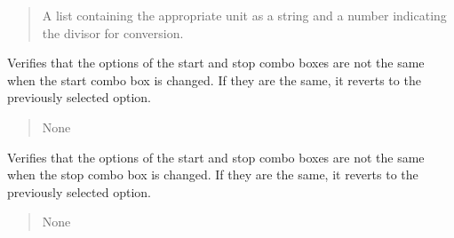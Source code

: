 \documentclass[letterpaper,10pt,english]{sphinxmanual}
\begin{document}
\begin{fulllineitems}
\begin{fulllineitems}
\begin{quote}
\begin{description}
\sphinxAtStartPar
A list containing the appropriate unit as a string and a number indicating 
the divisor for conversion.

\end{description}\end{quote}

\end{fulllineitems}


\begin{fulllineitems}
\label{\detokenize{FLIMGraphics:FLIMGraphics.FLIMGraphic.indexChangeStartChannel}}
\pysigstartsignatures
{}
\pysigstopsignatures
\sphinxAtStartPar
Verifies that the options of the start and stop combo boxes are not the same 
when the start combo box is changed. If they are the same, it reverts to 
the previously selected option.
\begin{quote}\begin{description}
\sphinxAtStartPar
None

\end{description}\end{quote}

\end{fulllineitems}


\begin{fulllineitems}
\label{\detokenize{FLIMGraphics:FLIMGraphics.FLIMGraphic.indexChangeStopChannel}}
\pysigstartsignatures
{}
\pysigstopsignatures
\sphinxAtStartPar
Verifies that the options of the start and stop combo boxes are not the same 
when the stop combo box is changed. If they are the same, it reverts to 
the previously selected option.
\begin{quote}\begin{description}
\sphinxAtStartPar
None

\end{description}\end{quote}

\end{fulllineitems}


\end{fulllineitems}
\end{document}
